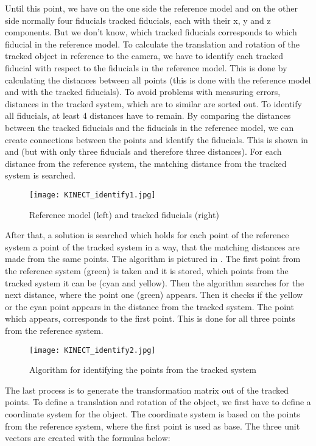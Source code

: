 Until this point, we have on the one side the reference model and on the other side normally four fiducials tracked fiducials, each with their x, y and z components. But we don’t know, which tracked fiducials corresponds to which fiducial in the reference model. To calculate the translation and rotation of the tracked object in reference to the camera, we have to identify each tracked fiducial with respect to the fiducials in the reference model. 
This is done by calculating the distances between all points (this is done with the reference model and with the tracked fiducials). To avoid problems with measuring errors, distances in the tracked system, which are to similar are sorted out. To identify all fiducials, at least 4 distances have to remain. By comparing the distances between the tracked fiducials and the fiducials in the reference model, we can create connections between the points and identify the fiducials. This is shown in  and   (but with only three fiducials and therefore three distances). For each distance from the reference system, the matching distance from the tracked system is searched. 
\begin{figure}[!t]
\centering
\texttt{[image: KINECT\_identify1.jpg]}
\caption{Reference model (left) and tracked fiducials (right)}
\label{fig:KINECT_identify1}
\end{figure}
After that, a solution is searched which holds for each point of the reference system a point of the tracked system in a way, that the matching distances are made from the same points. The algorithm is pictured in  . The first point from the reference system (green) is taken and it is stored, which points from the tracked system it can be (cyan and yellow). Then the algorithm searches for the next distance, where the point one (green) appears. Then it checks if the yellow or the cyan point appears in the distance from the tracked system. The point which appears, corresponds to the first point. This is done for all three points from the reference system.
\begin{figure}[!b]
\centering
\texttt{[image: KINECT\_identify2.jpg]}
\caption{Algorithm for identifying the points from the tracked system}
\label{fig:KINECT_identify2}
\end{figure}
The last process is to generate the transformation matrix out of the tracked points. To define a translation and rotation of the object, we first have to define a coordinate system for the object. The coordinate system is based on the points from the reference system, where the first point is used as base. The three unit vectors are created with the formulas below:
